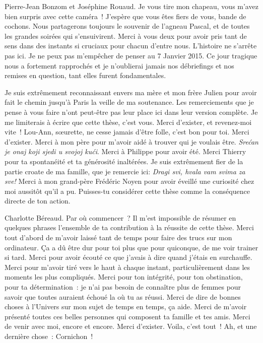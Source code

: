 Pierre-Jean Bonzom et Joséphine Rouaud. Je vous tire mon chapeau, vous
m'avez bien surpris avec cette caméra~! J'espère que vous êtes fiers
de vous, bande de cochons. Nous partagerons toujours le souvenir de
l'agneau Pascal, et de toutes les grandes soirées qui
s'ensuivirent. Merci à vous deux pour avoir pris tant de sens dans
des instants si cruciaux pour chacun d'entre nous. L'histoire ne
s'arrête pas ici. Je ne peux pas m'empêcher de penser au 7 Janvier
2015. Ce jour tragique nous a fortement rapprochés et je n'oublierai
jamais nos débriefings et nos remises en question, tant elles furent fondamentales.


Je suis extrêmement reconnaissant envers ma mère et mon frère Julien
pour avoir fait le chemin jusqu'à Paris la veille de ma
soutenance. Les remerciements que je pense à vous faire n'ont
peut-être pas leur place ici dans leur version complète. Je me
limiterais à écrire que cette thèse, c'est vous. Merci d'exister, et
revenez-moi vite~! Lou-Ann, s\oe{}urette, ne cesse jamais d'être
folle, c'est bon pour toi. Merci d'exister. Merci à mon père pour
m'avoir aidé à trouver qui je voulais être. \textit{Sre\'{c}an je onaj koji sjedi u svojoj ku\'{c}i}. Merci à Philippe pour avoir été. Merci
Thierry pour ta spontanéité et ta générosité inaltérées.
 Je suis
extrêmement fier de la partie croate de ma famille, que je remercie
ici: \textit{Dragi svi, hvala vam svima za sve!}
 Merci à mon grand-père
Frédéric Noyen pour avoir éveillé une curiosité chez moi aussitôt qu'il a
pu. Puisses-tu considérer cette thèse comme la conséquence directe de
ton action. 

Charlotte Béreaud. Par où commencer~? Il m'est impossible de
résumer en quelques phrases l'ensemble de ta contribution à la
réussite de cette thèse. Merci tout d'abord de m'avoir laissé tant de
temps pour faire des trucs sur mon ordinateur. Ça a dû être
dur pour toi plus que pour quiconque, de me voir trainer si tard. Merci pour
avoir écouté ce que j'avais à dire quand j'étais en surchauffe. Merci
pour m'avoir tiré vers le haut à chaque instant, particulièrement dans
les moments les plus compliqués. Merci pour ton intégrité, pour ton obstination,
pour ta détermination~: je n'ai pas besoin de connaître plus de femmes
pour savoir que toutes auraient échoué la où tu as réussi. Merci de
dire de bonnes choses à l'Univers sur mon sujet de temps en temps, ça
aide. Merci de m'avoir présenté toutes ces belles personnes qui
composent ta famille et tes amis. Merci de venir avec moi, encore
et encore. Merci d'exister. Voila, c'est tout~! Ah, et une dernière
chose~: Cornichon~!
